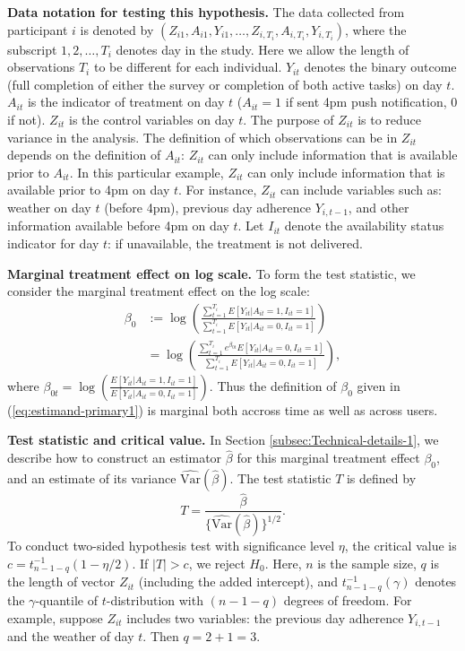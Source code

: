 \documentclass[11pt]{article}
\begin{document}
\textbf{Data notation for testing this hypothesis.} The data collected
from participant $i$ is denoted by $(Z_{i1},A_{i1},Y_{i1},\ldots,Z_{i,T_i},A_{i,T_i},Y_{i,T_i})$,
where the subscript $1,2,\ldots,T_i$ denotes day in the study. Here we allow the length of observations $T_i$ to be different for each individual. $Y_{it}$
denotes the binary outcome (full completion of either the survey or
completion of both active tasks) on day $t$. $A_{it}$ is the indicator
of treatment on day $t$ ($A_{it}=1$ if sent 4pm push notification,
0 if not). $Z_{it}$ is the control variables on day $t$. The purpose
of $Z_{it}$ is to reduce variance in the analysis. The definition
of which observations can be in $Z_{it}$ depends on the definition
of $A_{it}$: $Z_{it}$ can only include information that is available
prior to $A_{it}$. In this particular example, $Z_{it}$ can only
include information that is available prior to 4pm on day $t$. For
instance, $Z_{it}$ can include variables such as: weather on day
$t$ (before 4pm), previous day adherence $Y_{i,t-1}$, and other
information available before 4pm on day $t$. Let $I_{it}$ denote the availability status indicator for day $t$: if unavailable, the treatment is not delivered.

\textbf{Marginal treatment effect on log scale. }To form the test
statistic, we consider the marginal treatment effect on the log scale:
\begin{align}
\beta_{0} & :=\log\left(\frac{\sum_{t=1}^{T_i}E[Y_{it}|A_{it}=1, I_{it} = 1]}{\sum_{t=1}^{T_i}E[Y_{it}|A_{it}=0, I_{it} = 1]}\right)\nonumber \\
 & =\log\left(\frac{\sum_{t=1}^{T_i}e^{\beta_{0t}}E[Y_{it}|A_{it}=0, I_{it} = 1]}{\sum_{t=1}^{T_i}E[Y_{it}|A_{it}=0, I_{it} = 1]}\right),\label{eq:estimand-primary1}
\end{align}
where $\beta_{0t}=\log\left(\frac{E[Y_{it}|A_{it}=1, I_{it} = 1]}{E[Y_{it}|A_{it}=0, I_{it} = 1]}\right)$.
Thus the definition of $\beta_{0}$ given in (\ref{eq:estimand-primary1})
is marginal both accross time as well as across users.

\textbf{Test statistic and critical value.} In Section \ref{subsec:Technical-details-1},
we describe how to construct an estimator $\hat{\beta}$ for this
marginal treatment effect $\beta_{0}$, and an estimate of its variance
$\widehat{\text{Var}}(\hat{\beta})$. The test statistic $T$ is defined
by
\begin{equation}
T=\frac{\hat{\beta}}{\{\widehat{\text{Var}}(\hat{\beta})\}^{1/2}}.\label{eq:test-primary1}
\end{equation}
To conduct two-sided hypothesis test with significance level $\eta$,
the critical value is $c=t_{n-1-q}^{-1}(1 - \eta / 2)$. If $|T|>c$, we
reject $H_{0}$. Here, $n$ is the sample size, $q$ is the length
of vector $Z_{it}$ (including the added intercept), and $t_{n-1-q}^{-1}(\gamma)$
denotes the $\gamma$-quantile of $t$-distribution with $(n-1-q)$
degrees of freedom. For example, suppose $Z_{it}$ includes two variables:
the previous day adherence $Y_{i,t-1}$ and the weather of day $t$.
Then $q=2+1=3$.
\end{document}
